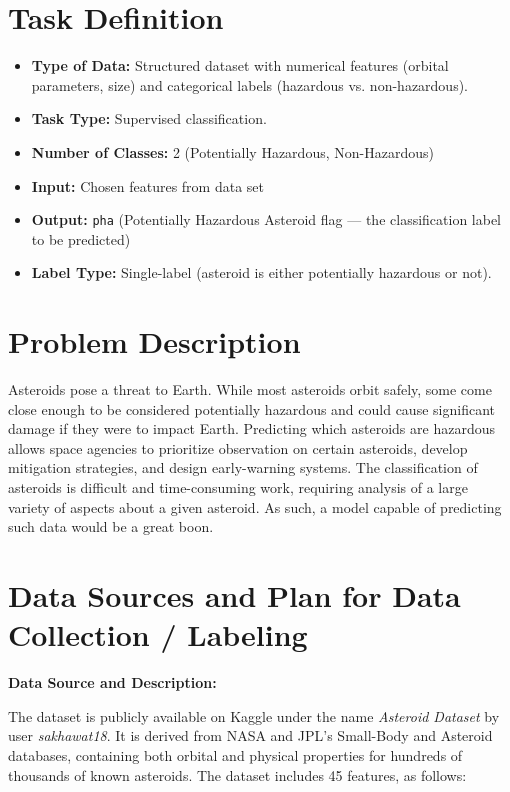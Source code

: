 \documentclass[12pt]{article}
\begin{document}
\section{Task Definition}
\begin{itemize}
    \item \textbf{Type of Data:} Structured dataset with numerical features (orbital parameters, size) and categorical labels (hazardous vs. non-hazardous).
    \item \textbf{Task Type:} Supervised classification.
    \item \textbf{Number of Classes:} 2 (Potentially Hazardous, Non-Hazardous)
    \item \textbf{Input:} Chosen features from data set
    \item \textbf{Output:} \texttt{pha} (Potentially Hazardous Asteroid flag — the classification label to be predicted)
    \item \textbf{Label Type:} Single-label (asteroid is either potentially hazardous or not).
\end{itemize}

\section{Problem Description}
Asteroids pose a threat to Earth.
While most asteroids orbit safely, some come close enough to be considered potentially hazardous and could cause significant damage if they were to impact Earth.
Predicting which asteroids are hazardous allows space agencies to prioritize observation on certain asteroids, develop mitigation strategies, and design early-warning systems.
The classification of asteroids is difficult and time-consuming work, requiring analysis of a large variety of aspects about a given asteroid.
As such, a model capable of predicting such data would be a great boon.

\section{Data Sources and Plan for Data Collection / Labeling}

\textbf{Data Source and Description:}

The dataset is publicly available on Kaggle under the name \textit{Asteroid Dataset} by user \textit{sakhawat18}.
It is derived from NASA and JPL’s Small-Body and Asteroid databases, containing both orbital and physical properties for hundreds of thousands of known asteroids.
The dataset includes 45 features, as follows:
\end{document}
